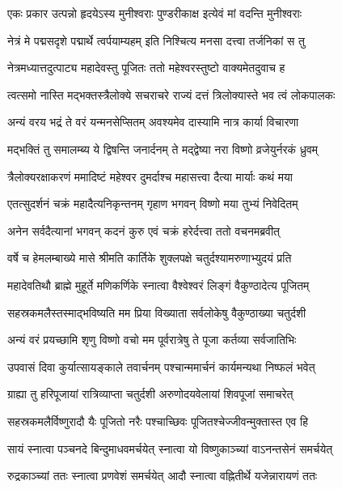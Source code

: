 \twolineshloka
{एकः प्रकार उत्पन्नो हृदयेऽस्य मुनीश्वराः}
{पुण्डरीकाक्ष इत्येवं मां वदन्ति मुनीश्वराः} %

\twolineshloka
{नेत्रं मे पद्मसदृशे पद्मार्थे त्वर्पयाम्यहम्}
{इति निश्चित्य मनसा दत्त्वा तर्जनिकां स तु} %

\twolineshloka
{नेत्रमध्यात्तदुत्पाट्य महादेवस्तु पूजितः}
{ततो महेश्वरस्तुष्टो वाक्यमेतदुवाच ह} %


\twolineshloka
{त्वत्समो नास्ति मद्भक्तस्त्रैलोक्ये सचराचरे}
{राज्यं दत्तं त्रिलोक्यास्ते भव त्वं लोकपालकः} %

\twolineshloka
{अन्यं वरय भद्रं ते वरं यन्मनसेप्सितम्}
{अवश्यमेव दास्यामि नात्र कार्या विचारणा} %

\twolineshloka
{मद्भक्तिं तु समालम्ब्य ये द्विषन्ति जनार्दनम्}
{ते मद्द्वेष्या नरा विष्णो व्रजेयुर्नरकं ध्रुवम्} %


\twolineshloka
{त्रैलोक्यरक्षाकरणं ममादिष्टं महेश्वर}
{दुमर्दाश्च महासत्त्वा दैत्या मार्याः कथं मया} %

\twolineshloka
{एतत्सुदर्शनं चक्रं महादैत्यनिकृन्तनम्}
{गृहाण भगवन् विष्णो मया तुभ्यं निवेदितम्} %

\twolineshloka
{अनेन सर्वदैत्यानां भगवन् कदनं कुरु}
{एवं चक्रं हरेर्दत्त्वा ततो वचनमब्रवीत्} %


\twolineshloka
{वर्षे च हेमलम्बाख्ये मासे श्रीमति कार्तिके}
{शुक्लपक्षे चतुर्दश्यामरुणाभ्युदयं प्रति} %

\twolineshloka
{महादेवतिथौ ब्राह्मे मुहूर्ते मणिकर्णिके}
{स्नात्वा वैश्वेश्वरं लिङ्गं वैकुण्ठादेत्य पूजितम्} %

\twolineshloka
{सहस्रकमलैस्तस्माद्भविष्यति मम प्रिया}
{विख्याता सर्वलोकेषु वैकुण्ठाख्या चतुर्दशी} %

\twolineshloka
{अन्यं वरं प्रयच्छामि शृणु विष्णो वचो मम}
{पूर्वरात्रेषु ते पूजा कर्तव्या सर्वजातिभिः} %

\twolineshloka
{उपवासं दिवा कुर्यात्सायङ्काले तवार्चनम्}
{पश्चान्ममार्चनं कार्यमन्यथा निष्फलं भवेत्} %

\twolineshloka
{ग्राह्या तु हरिपूजायां रात्रिव्याप्ता चतुर्दशी}
{अरुणोदयवेलायां शिवपूजां समाचरेत्} %

\twolineshloka
{सहस्रकमलैर्विष्णुरादौ यैः पूजितो नरैः}
{पश्चाच्छिवः पूजितश्चेज्जीवन्मुक्तास्त एव हि} %

\twolineshloka
{सायं स्नात्वा पञ्चनदे बिन्दुमाधवमर्चयेत्}
{स्नात्वा यो विष्णुकाञ्च्यां वाऽनन्तसेनं समर्चयेत्} %

\twolineshloka
{रुद्रकाञ्च्यां ततः स्नात्वा प्रणवेशं समर्चयेत्}
{आदौ स्नात्वा वह्नितीर्थे यजेन्नारायणं ततः} %

